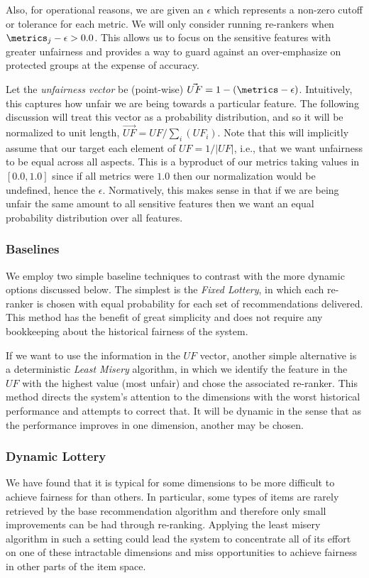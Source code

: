 Also, for operational reasons, we are given an $\epsilon$ which represents a non-zero cutoff or tolerance for each metric.  We will only consider running re-rankers when $\metrics_j - \epsilon > 0.0$. This allows us to focus on the sensitive features with greater unfairness and provides a way to guard against an over-emphasize on protected groups at the expense of accuracy.

Let the \emph{unfairness vector} be (point-wise) $\vec{UF} = 1 - (\metrics - \epsilon)$.  Intuitively, this captures how unfair we are being towards a particular feature.  The following discussion will treat this vector as a probability distribution, and so it will be normalized to unit length, $\vec{UF} = UF / \sum_i(UF_i)$. Note that this will implicitly assume that our target each element of $UF = 1/|UF|$, i.e., that we want unfairness to be equal across all aspects.  This is a byproduct of our metrics taking values in $[0.0,1.0]$ since if all metrics were $1.0$ then our normalization would be undefined, hence the $\epsilon$.  Normatively, this makes sense in that if we are being unfair the same amount to all sensitive features then we want an equal probability distribution over all features.


\subsubsection{Baselines}
We employ two simple baseline techniques to contrast with the more dynamic options discussed below. The simplest is the \textit{Fixed Lottery}, in which each re-ranker is chosen with equal probability for each set of recommendations delivered. This method has the benefit of great simplicity and does not require any bookkeeping about the historical fairness of the system. 

If we want to use the information in the $UF$ vector, another simple alternative is a deterministic \textit{Least Misery} algorithm, in which we identify the feature in the $UF$ with the highest value (most unfair) and chose the associated re-ranker. This method directs the system's attention to the dimensions with the worst historical performance and attempts to correct that. It will be dynamic in the sense that as the performance improves in one dimension, another may be chosen.



\subsubsection{Dynamic Lottery}
We have found that it is typical for some dimensions to be more difficult to achieve fairness for than others. In particular, some types of items are rarely retrieved by the base recommendation algorithm and therefore only small improvements can be had through re-ranking. Applying the least misery algorithm in such a setting could lead the system to concentrate all of its effort on one of these intractable dimensions and miss opportunities to achieve fairness in other parts of the item space. 

